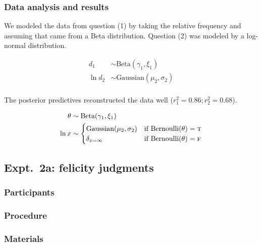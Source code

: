 \documentclass[10pt,letterpaper]{article}
\begin{document}
\subsubsection{Data analysis and results}

We modeled the data from question (1) by taking the relative frequency and assuming that came from a Beta distribution. Question (2) was modeled by a log-normal distribution. 
\begin{minipage}{0.5 \textwidth} \small
\begin{align*}
d_{1} &\sim \text{Beta}(\gamma_{1}, \xi_{1}) \\
\ln d_{2} &\sim \text{Gaussian}(\mu_{2}, \sigma_{2}) \\
\end{align*}
\end{minipage}

The posterior predictives reconstructed the data well ($r^2_{1} = 0.86; r^2_{2} = 0.68$).


\begin{minipage}{0.5 \textwidth} \small
\begin{align*}
\theta & \sim \text{Beta}(\gamma_{1}, \xi_{1}) \\ 
\ln x & \sim \begin{cases} 
		\text{Gaussian}(\mu_{2}, \sigma_{2}) &\mbox{if } \text{Bernoulli}(\theta) = \textsc{t} \\
				\delta_{x=\infty} &\mbox{if } \text{Bernoulli}(\theta) = \textsc{f} \\
		\end{cases} \\
\end{align*}
\end{minipage}



\subsection{Expt.~2a: felicity judgments}
\subsubsection{Participants}
\subsubsection{Procedure}
\subsubsection{Materials}
\end{document}
